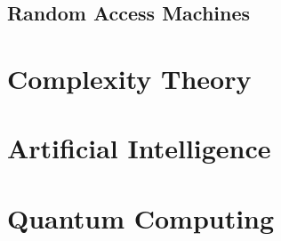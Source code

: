 \subsection{Random Access Machines}



\section{Complexity Theory}




\section{Artificial Intelligence}




\section{Quantum Computing}






\begin{comment}

Programming/Algorithms: 
-Turing completeness, Turing-machine, random-access-machine
 Super turing machines: https://en.wikipedia.org/wiki/Hypercomputation

https://en.wikipedia.org/wiki/Chaitin%


https://www.youtube.com/watch?v=yi4Ho_K5LRw  What is Primitive Recursion?

\end{comment}